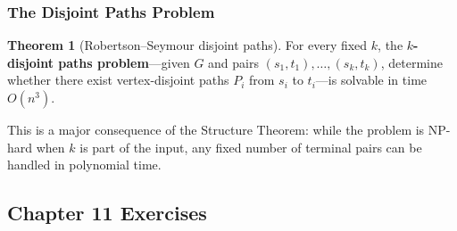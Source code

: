 \documentclass{article}
\theoremstyle{definition}
\newtheorem{theorem}{Theorem}
\begin{document}
\subsubsection{The Disjoint Paths Problem}

\begin{theorem}[Robertson--Seymour disjoint paths]
For every fixed $k$, the \textbf{$k$-disjoint paths problem}---given
$G$ and pairs $(s_1, t_1), \dots, (s_k, t_k)$, determine whether there
exist vertex-disjoint paths $P_i$ from $s_i$ to $t_i$---is solvable
in time $O(n^3)$.
\end{theorem}

This is a major consequence of the Structure Theorem: while the
problem is $\mathrm{NP}$-hard when $k$ is part of the input, any
fixed number of terminal pairs can be handled in polynomial time.

\subsection{Chapter 11 Exercises}
\end{document}
